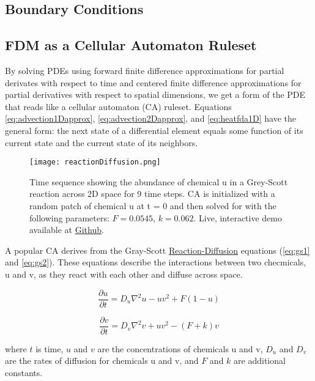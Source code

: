 {\subsection{Boundary Conditions}

\subsection{FDM as a Cellular Automaton Ruleset}

By solving PDEs using forward finite difference approximations for partial derivates with respect to time and centered finite difference approximations for partial derivatives with respect to spatial dimensions, we get a form of the PDE that reads like a cellular automaton (CA) ruleset.  Equations \ref{eq:advection1Dapprox}, \ref{eq:advection2Dapprox}, and \ref{eq:heatfda1D} have the general form: the next state of a differential element equals some function of its current state and the current state of its neighbors.\\

\begin{figure}
  \texttt{[image: reactionDiffusion.png]}
  \caption{Time sequence showing the abundance of chemical u in a Grey-Scott reaction across 2D space for 9 time steps.  CA is initialized with a random patch of chemical u at t = 0 and then solved for with the following parameters: $F = 0.0545$, $k=0.062$.  Live, interactive demo available at \href{http://git.amandaghassaei.com/ReactionDiffusionShader/}{Github}.}
  \label{fig:willAssembler}
\end{figure}

A popular CA derives from the Gray-Scott \href{https://en.wikipedia.org/wiki/Reaction%E2%80%93diffusion_system#Two-component_reaction.E2.80.93diffusion_equations}{Reaction-Diffusion} equations (\ref{eq:gs1} and \ref{eq:gs2}).  These equations describe the interactions between two checmicals, u and v, as they react with each other and diffuse across space.

 \begin{equation}\label{eq:gs1}
  \frac{\partial u}{\partial t} = D_{u}\nabla^{2} u -uv^{2} + F(1-u)
  \end{equation}
  
   \begin{equation}\label{eq:gs2}
  \frac{\partial v}{\partial t} = D_{v}\nabla^{2} v +uv^{2} - (F+k)v
  \end{equation}
  
  where $t$ is time, $u$ and $v$ are the concentrations of chemicals u and v, $D_{u}$ and $D_{v}$ are the rates of diffusion for chemicals u and v, and $F$ and $k$ are additional constants.  \\
  
}
